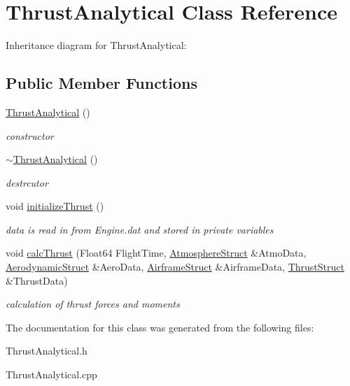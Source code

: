 \hypertarget{class_thrust_analytical}{}\section{Thrust\+Analytical Class Reference}
\label{class_thrust_analytical}


Inheritance diagram for Thrust\+Analytical\+:
\subsection*{Public Member Functions}
\begin{DoxyCompactItemize}
\item 
\mbox{\label{class_thrust_analytical_a5c75949a22871e861090560adb2d5f18}} 
\hyperlink{class_thrust_analytical_a5c75949a22871e861090560adb2d5f18}{Thrust\+Analytical} ()
\begin{DoxyCompactList}\small\item\em constructor \end{DoxyCompactList}\item 
\mbox{\label{class_thrust_analytical_aeaf9dd69c10812c673d6cfae0d7ca4fd}} 
\hyperlink{class_thrust_analytical_aeaf9dd69c10812c673d6cfae0d7ca4fd}{$\sim$\+Thrust\+Analytical} ()
\begin{DoxyCompactList}\small\item\em destrcutor \end{DoxyCompactList}\item 
\mbox{\label{class_thrust_analytical_a5c1db29b00aa92e9f22806b0ea482e05}} 
void \hyperlink{class_thrust_analytical_a5c1db29b00aa92e9f22806b0ea482e05}{initialize\+Thrust} ()
\begin{DoxyCompactList}\small\item\em data is read in from Engine.\+dat and stored in private variables \end{DoxyCompactList}\item 
\mbox{\label{class_thrust_analytical_a521b775b57dc2324f09496efb8b12452}} 
void \hyperlink{class_thrust_analytical_a521b775b57dc2324f09496efb8b12452}{calc\+Thrust} (Float64 Flight\+Time, \hyperlink{struct_atmosphere_struct}{Atmosphere\+Struct} \&Atmo\+Data, \hyperlink{struct_aerodynamic_struct}{Aerodynamic\+Struct} \&Aero\+Data, \hyperlink{struct_airframe_struct}{Airframe\+Struct} \&Airframe\+Data, \hyperlink{struct_thrust_struct}{Thrust\+Struct} \&Thrust\+Data)
\begin{DoxyCompactList}\small\item\em calculation of thrust forces and moments \end{DoxyCompactList}\end{DoxyCompactItemize}


The documentation for this class was generated from the following files\+:\begin{DoxyCompactItemize}
\item 
Thrust\+Analytical.\+h\item 
Thrust\+Analytical.\+cpp\end{DoxyCompactItemize}

